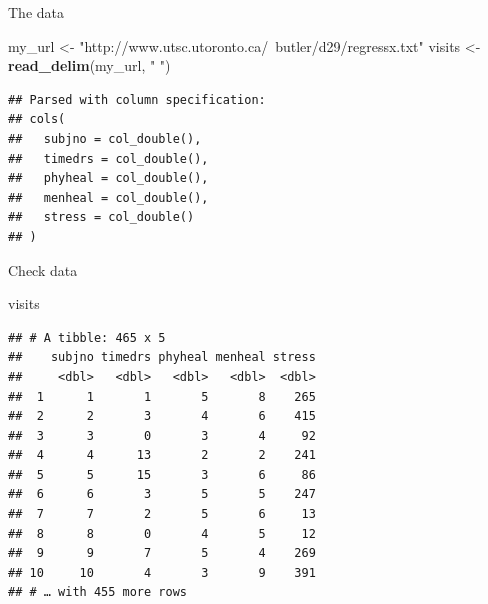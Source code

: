 \documentclass[ignorenonframetext,]{beamer}
\newenvironment{Shaded}{\begin{snugshade}}{\end{snugshade}}
\newcommand{\KeywordTok}[1]{\textcolor[rgb]{0.13,0.29,0.53}{\textbf{#1}}}
\newcommand{\NormalTok}[1]{#1}
\newcommand{\StringTok}[1]{\textcolor[rgb]{0.31,0.60,0.02}{#1}}
\begin{document}
\begin{frame}[fragile]{The data}
\protect\hypertarget{the-data}{}

\begin{Shaded}
\begin{Highlighting}[]
\NormalTok{my_url <-}\StringTok{ }
\StringTok{  "http://www.utsc.utoronto.ca/~butler/d29/regressx.txt"}
\NormalTok{visits <-}\StringTok{ }\KeywordTok{read_delim}\NormalTok{(my_url, }\StringTok{" "}\NormalTok{)}
\end{Highlighting}
\end{Shaded}

\begin{verbatim}
## Parsed with column specification:
## cols(
##   subjno = col_double(),
##   timedrs = col_double(),
##   phyheal = col_double(),
##   menheal = col_double(),
##   stress = col_double()
## )
\end{verbatim}

\end{frame}

\begin{frame}[fragile]{Check data}
\protect\hypertarget{check-data-1}{}

\small

\begin{Shaded}
\begin{Highlighting}[]
\NormalTok{visits}
\end{Highlighting}
\end{Shaded}

\begin{verbatim}
## # A tibble: 465 x 5
##    subjno timedrs phyheal menheal stress
##     <dbl>   <dbl>   <dbl>   <dbl>  <dbl>
##  1      1       1       5       8    265
##  2      2       3       4       6    415
##  3      3       0       3       4     92
##  4      4      13       2       2    241
##  5      5      15       3       6     86
##  6      6       3       5       5    247
##  7      7       2       5       6     13
##  8      8       0       4       5     12
##  9      9       7       5       4    269
## 10     10       4       3       9    391
## # … with 455 more rows
\end{verbatim}

\normalsize

\end{frame}
\end{document}
